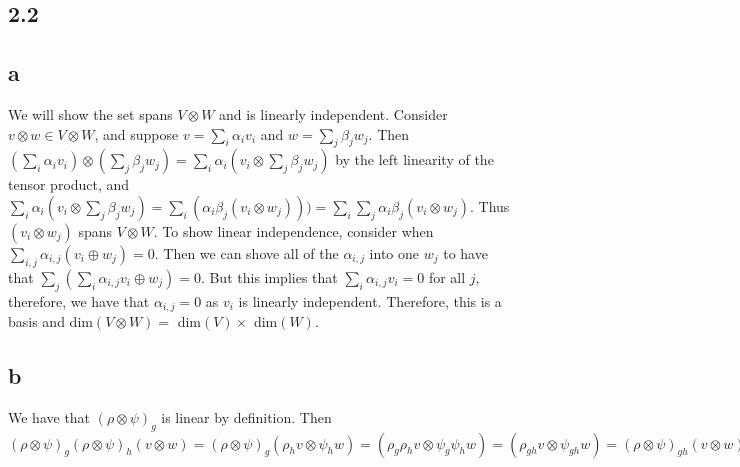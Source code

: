 \documentclass[]{article}
\begin{document}
\subsection*{2.2}
\subsection*{a}
We will show the set spans $V \otimes W$ and is linearly independent.
Consider $v \otimes w \in V \otimes W$, and suppose $v = \sum_i \alpha_i v_i$ and $w = \sum_j \beta_j w_j$. Then $ (\sum_i \alpha_i v_i) \otimes (\sum_j \beta_j w_j) = \sum_i \alpha_i (v_i \otimes \sum_j \beta_j w_j)$ by the left linearity of the tensor product, and $\sum_i \alpha_i (v_i \otimes \sum_j \beta_j w_j) = \sum_i (\alpha_i \beta_j (v_i \otimes w_j))) = \sum_i \sum_j \alpha_i \beta_j (v_i \otimes w_j)$. Thus $(v_i \otimes w_j)$ spans $V \otimes W$. To show linear independence, consider when $\sum_{i, j} \alpha_{i,j} (v_i \oplus w_j) = 0$. Then we can shove all of the $\alpha_{i, j}$ into one $w_j$ to have that $\sum_j ( \sum_i \alpha_{i,j} v_i \oplus w_j) = 0$. But this implies that $\sum_i \alpha_{i,j} v_i = 0$ for all $j$, therefore, we have that $\alpha_{i, j} = 0$ as $v_i$ is linearly independent. Therefore, this is a basis and dim$(V \otimes W) =$ dim$(V) \times$ dim$(W)$.
\subsection*{b}
We have that $(\rho \otimes \psi)_g$ is linear by definition. Then  $(\rho \otimes \psi)_g (\rho \otimes \psi)_h (v \otimes w) = (\rho \otimes \psi)_g (\rho_h v \otimes \psi_h w) = (\rho_g \rho_h v \otimes \psi_g \psi_h w) = (\rho_{gh} v \otimes \psi_{gh} w) = (\rho \otimes \psi)_{gh} (v \otimes w)$
\end{document}
